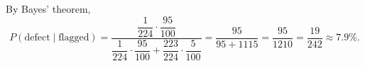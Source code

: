 By Bayes' theorem,
\[P(\text{defect}\mid\text{flagged})=\dfrac{\dfrac1{224}\cdot\dfrac{95}{100}}{\dfrac1{224}\cdot\dfrac{95}{100}+\dfrac{223}{224}\cdot\dfrac5{100}}=\dfrac{95}{95+1115}=\dfrac{95}{1210}=\boxed{\dfrac{19}{242}}\approx7.9\%.\]
